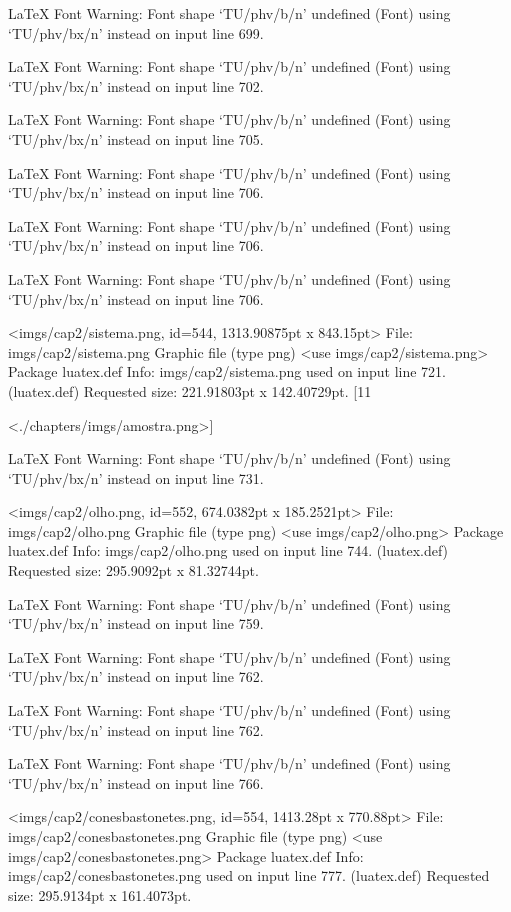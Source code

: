 LaTeX Font Warning: Font shape `TU/phv/b/n' undefined
(Font)              using `TU/phv/bx/n' instead on input line 699.


LaTeX Font Warning: Font shape `TU/phv/b/n' undefined
(Font)              using `TU/phv/bx/n' instead on input line 702.


LaTeX Font Warning: Font shape `TU/phv/b/n' undefined
(Font)              using `TU/phv/bx/n' instead on input line 705.


LaTeX Font Warning: Font shape `TU/phv/b/n' undefined
(Font)              using `TU/phv/bx/n' instead on input line 706.


LaTeX Font Warning: Font shape `TU/phv/b/n' undefined
(Font)              using `TU/phv/bx/n' instead on input line 706.


LaTeX Font Warning: Font shape `TU/phv/b/n' undefined
(Font)              using `TU/phv/bx/n' instead on input line 706.

<imgs/cap2/sistema.png, id=544, 1313.90875pt x 843.15pt>
File: imgs/cap2/sistema.png Graphic file (type png)
<use imgs/cap2/sistema.png>
Package luatex.def Info: imgs/cap2/sistema.png  used on input line 721.
(luatex.def)             Requested size: 221.91803pt x 142.40729pt.
[11

<./chapters/imgs/amostra.png>]

LaTeX Font Warning: Font shape `TU/phv/b/n' undefined
(Font)              using `TU/phv/bx/n' instead on input line 731.

<imgs/cap2/olho.png, id=552, 674.0382pt x 185.2521pt>
File: imgs/cap2/olho.png Graphic file (type png)
<use imgs/cap2/olho.png>
Package luatex.def Info: imgs/cap2/olho.png  used on input line 744.
(luatex.def)             Requested size: 295.9092pt x 81.32744pt.

LaTeX Font Warning: Font shape `TU/phv/b/n' undefined
(Font)              using `TU/phv/bx/n' instead on input line 759.


LaTeX Font Warning: Font shape `TU/phv/b/n' undefined
(Font)              using `TU/phv/bx/n' instead on input line 762.


LaTeX Font Warning: Font shape `TU/phv/b/n' undefined
(Font)              using `TU/phv/bx/n' instead on input line 762.


LaTeX Font Warning: Font shape `TU/phv/b/n' undefined
(Font)              using `TU/phv/bx/n' instead on input line 766.

<imgs/cap2/conesbastonetes.png, id=554, 1413.28pt x 770.88pt>
File: imgs/cap2/conesbastonetes.png Graphic file (type png)
<use imgs/cap2/conesbastonetes.png>
Package luatex.def Info: imgs/cap2/conesbastonetes.png  used on input line 777.
(luatex.def)             Requested size: 295.9134pt x 161.4073pt.

